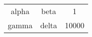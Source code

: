 \begin{table}
\centering
\begin{tabular}{ccc}
\toprule
alpha 	 & beta 	 & 1 \\
gamma 	 & delta 	 & 10000 \\
\bottomrule
\end{tabular}
\end{table}